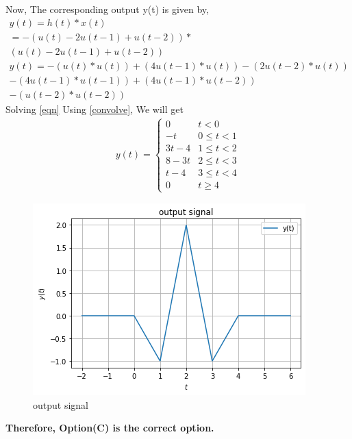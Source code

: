 \documentclass[journal,12pt,twocolumn]{IEEEtran}
\begin{document}
Now, The corresponding output y(t) is given by,
\begin{multline}
    y(t) = h(t) * x(t)\\
    = -(u(t)-2u(t-1)+u(t-2))*\\(u(t)-2u(t-1)+u(t-2))\\
  y(t) = -(u(t)*u(t))+(4u(t-1)*u(t))-(2u(t-2)*u(t))\\-(4u(t-1)*u(t-1))+(4u(t-1)*u(t-2))\\-(u(t-2)*u(t-2))\label{eqn}
\end{multline}
Solving \eqref{eqn} Using \ref{convolve}, We will get
\begin{align}
    y(t) = \begin{cases}
    0 & t<0\\
    -t & 0\le t < 1\\
    3t-4 & 1\le t <2 \\
    8-3t & 2\le t < 3\\
    t-4 & 3\le t<4\\
    0 & t\ge 4
    \end{cases}
\end{align}
 \begin{figure}[!htp]
\centering
 \includegraphics[width=\columnwidth]{output.png}
 \caption{output signal}
 \end{figure}
 \textbf{Therefore, Option(C) is the correct option.}
\end{document}
